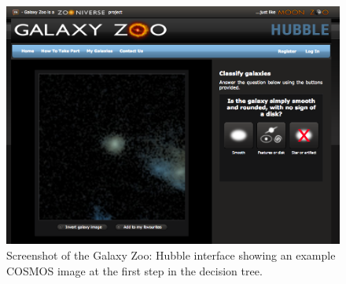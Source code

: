 \documentclass[twocolumn]{aastex6}
\begin{document}
\begin{figure}
\center
\includegraphics[width=160mm]{figures/gzh_interface.png}
\caption{Screenshot of the Galaxy Zoo: Hubble interface showing an example COSMOS image at the first step in the decision tree.\label{fig:interface}}
\end{figure}
\end{document}
